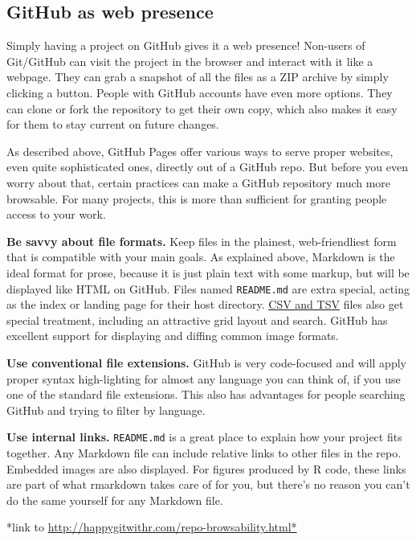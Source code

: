 \documentclass[12pt]{article}
\begin{document}
\subsection{GitHub as web presence}\label{github-as-web-presence}

Simply having a project on GitHub gives it a web presence! Non-users of
Git/GitHub can visit the project in the browser and interact with it
like a webpage. They can grab a snapshot of all the files as a ZIP
archive by simply clicking a button. People with GitHub accounts have
even more options. They can clone or fork the repository to get their
own copy, which also makes it easy for them to stay current on future
changes.

As described above, GitHub Pages offer various ways to serve proper
websites, even quite sophisticated ones, directly out of a GitHub repo.
But before you even worry about that, certain practices can make a
GitHub repository much more browsable. For many projects, this is more
than sufficient for granting people access to your work.

\textbf{Be savvy about file formats.} Keep files in the plainest,
web-friendliest form that is compatible with your main goals. As
explained above, Markdown is the ideal format for prose, because it is
just plain text with some markup, but will be displayed like HTML on
GitHub. Files named \texttt{README.md} are extra special, acting as the
index or landing page for their host directory.
\href{https://help.github.com/articles/rendering-csv-and-tsv-data/}{CSV
and TSV} files also get special treatment, including an attractive grid
layout and search. GitHub has excellent support for displaying and
diffing common image formats.

\textbf{Use conventional file extensions.} GitHub is very code-focused
and will apply proper syntax high-lighting for almost any language you
can think of, if you use one of the standard file extensions. This also
has advantages for people searching GitHub and trying to filter by
language.

\textbf{Use internal links.} \texttt{README.md} is a great place to
explain how your project fits together. Any Markdown file can include
relative links to other files in the repo. Embedded images are also
displayed. For figures produced by R code, these links are part of what
rmarkdown takes care of for you, but there's no reason you can't do the
same yourself for any Markdown file.

*link to \url{http://happygitwithr.com/repo-browsability.html*}
\end{document}
